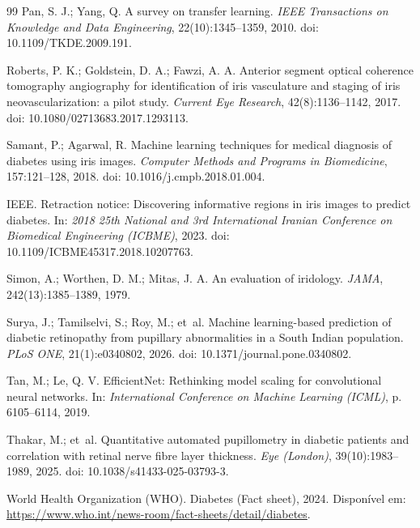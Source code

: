 \documentclass[12pt,a4paper]{article}
\begin{document}
\begin{thebibliography}{99}
Pan, S. J.; Yang, Q.
\newblock A survey on transfer learning.
\newblock \emph{IEEE Transactions on Knowledge and Data Engineering}, 22(10):1345--1359, 2010.
\newblock doi: 10.1109/TKDE.2009.191.

Roberts, P. K.; Goldstein, D. A.; Fawzi, A. A.
\newblock Anterior segment optical coherence tomography angiography for identification of iris
vasculature and staging of iris neovascularization: a pilot study.
\newblock \emph{Current Eye Research}, 42(8):1136--1142, 2017.
\newblock doi: 10.1080/02713683.2017.1293113.

Samant, P.; Agarwal, R.
\newblock Machine learning techniques for medical diagnosis of diabetes using iris images.
\newblock \emph{Computer Methods and Programs in Biomedicine}, 157:121--128, 2018.
\newblock doi: 10.1016/j.cmpb.2018.01.004.

IEEE.
\newblock Retraction notice: Discovering informative regions in iris images to predict diabetes.
\newblock In: \emph{2018 25th National and 3rd International Iranian Conference on Biomedical
Engineering (ICBME)}, 2023.
\newblock doi: 10.1109/ICBME45317.2018.10207763.

Simon, A.; Worthen, D. M.; Mitas, J. A.
\newblock An evaluation of iridology.
\newblock \emph{JAMA}, 242(13):1385--1389, 1979.

Surya, J.; Tamilselvi, S.; Roy, M.; et~al.
\newblock Machine learning-based prediction of diabetic retinopathy from pupillary abnormalities in a
South Indian population.
\newblock \emph{PLoS ONE}, 21(1):e0340802, 2026.
\newblock doi: 10.1371/journal.pone.0340802.

Tan, M.; Le, Q. V.
\newblock EfficientNet: Rethinking model scaling for convolutional neural networks.
\newblock In: \emph{International Conference on Machine Learning (ICML)}, p. 6105--6114, 2019.

Thakar, M.; et~al.
\newblock Quantitative automated pupillometry in diabetic patients and correlation with retinal nerve
fibre layer thickness.
\newblock \emph{Eye (London)}, 39(10):1983--1989, 2025.
\newblock doi: 10.1038/s41433-025-03793-3.

World Health Organization (WHO).
\newblock Diabetes (Fact sheet), 2024.
\newblock Disponível em: \url{https://www.who.int/news-room/fact-sheets/detail/diabetes}.


\end{thebibliography}
\end{document}
